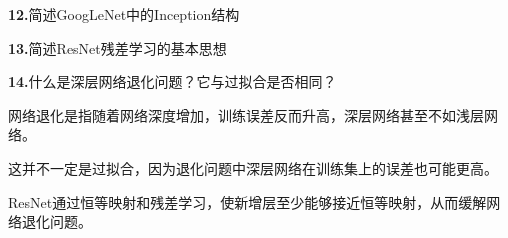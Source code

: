 \documentclass[UTF8,openany,oneside,zihao=-4,fontset=windows]{ctexbook}
\newif\ifshowsolutions
\newcommand{\Question}[2]{%
  \par\Needspace{4\baselineskip}\medskip
  \noindent\textbf{\color{MVBlue}#1}\quad #2\par
}
\newenvironment{AnswerBox}{\begin{tcolorbox}[breakable,colback=MVLight,colframe=MVBlue!45,title={参考答案},fonttitle=\bfseries,boxrule=0.55pt,arc=1.5mm,left=2mm,right=2mm,top=1.5mm,bottom=1.5mm]}{\end{tcolorbox}}
\newcommand{\PracticeSpace}[1]{\ifshowsolutions\else\par\vspace{#1}\par\fi}
\begin{document}
\else
\PracticeSpace{2.4cm}
\fi
\Question{12.}{简述GoogLeNet中的Inception结构}
\ifshowsolutions
\begin{AnswerBox}
\par\noindent\textbf{Inception结构在同一层并行使用不同尺度的操作，例如：}
\par\noindent\textbullet\quad 1×1 卷积；
\par\noindent\textbullet\quad 3×3 卷积；
\par\noindent\textbullet\quad 5×5 卷积；
\par 池化。
\par 然后将各分支输出沿通道维拼接。
\par 其作用是同时提取不同尺度的图像特征。
\par\noindent\textbf{其中 1×1 卷积常用于：}
\par\noindent\textbullet\quad 调整通道数；
\par\noindent\textbullet\quad 降低后续大卷积的计算量；
\par 引入非线性。
\end{AnswerBox}
\else
\PracticeSpace{2.4cm}
\fi
\Question{13.}{简述ResNet残差学习的基本思想}
\ifshowsolutions
\begin{AnswerBox}
\par 普通网络直接学习目标映射 H(x)，ResNet改为学习残差：
\par F(x)=H(x)−x
\par\noindent\textbf{因此输出为：}
\par y=F(x)+x
\par\noindent\textbf{如果新增网络层没有学到有效映射，只需使：}
\par F(x)≈0
\par 残差块就近似恒等映射，不会明显破坏原有特征。
\par\noindent\textbf{残差连接还为梯度提供了直接传播路径，可以缓解：}
\par\noindent\textbullet\quad 梯度消失；
\par\noindent\textbullet\quad 深层网络退化；
\par 深层网络难以优化的问题。
\end{AnswerBox}
\else
\PracticeSpace{2.4cm}
\fi
\Question{14.}{什么是深层网络退化问题？它与过拟合是否相同？}
\ifshowsolutions
\begin{AnswerBox}
\par 网络退化是指随着网络深度增加，训练误差反而升高，深层网络甚至不如浅层网络。
\par 这并不一定是过拟合，因为退化问题中深层网络在训练集上的误差也可能更高。
\par ResNet通过恒等映射和残差学习，使新增层至少能够接近恒等映射，从而缓解网络退化问题。
\end{AnswerBox}
\end{document}
